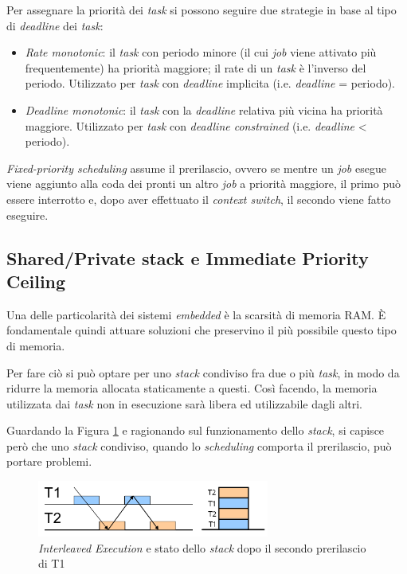 \documentclass{article}
\begin{document}
Per assegnare la priorità dei \textit{task} si possono seguire due strategie in base al tipo di \textit{deadline} dei \textit{task}:

\begin{itemize}
	\item \textit{Rate monotonic}: il \textit{task} con periodo minore (il cui \textit{job} viene attivato più frequentemente) ha priorità maggiore; il rate di un \textit{task} è l'inverso del periodo. Utilizzato per \textit{task} con \textit{deadline} implicita (i.e. \textit{deadline} = periodo).
	\item \textit{Deadline monotonic}: il \textit{task} con la \textit{deadline} relativa più vicina ha priorità maggiore. Utilizzato per \textit{task} con \textit{deadline constrained} (i.e. \textit{deadline} < periodo).
\end{itemize}

\textit{Fixed-priority scheduling} assume il prerilascio, ovvero se mentre un \textit{job} esegue viene aggiunto alla coda dei pronti un altro \textit{job} a priorità maggiore, il primo può essere interrotto e, dopo aver effettuato il \textit{context switch}, il secondo viene fatto eseguire.

\subsection{Shared/Private stack e Immediate Priority Ceiling}
Una delle particolarità dei sistemi \textit{embedded} è la scarsità di memoria RAM. È fondamentale quindi attuare soluzioni che preservino il più possibile questo tipo di memoria.

Per fare ciò si può optare per uno \textit{stack} condiviso fra due o più \textit{task}, in modo da ridurre la memoria allocata staticamente a questi. Così facendo, la memoria utilizzata dai \textit{task} non in esecuzione sarà libera ed utilizzabile dagli altri.

Guardando la Figura \ref{interlived-execution} e ragionando sul funzionamento dello \textit{stack}, si capisce però che uno \textit{stack} condiviso, quando lo \textit{scheduling} comporta il prerilascio, può portare problemi. 

\begin{figure}[!htbp]
	\centering
	\includegraphics[width=3in]{image/Interleaved_execution-stack.png}
	\caption{\textit{Interleaved Execution} e stato dello \textit{stack} dopo il secondo prerilascio di T1}
	\label{interlived-execution}
\end{figure}
\end{document}
